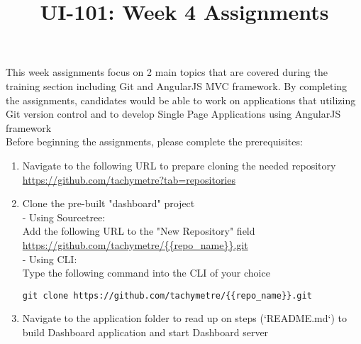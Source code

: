 \documentclass[12pt]{article}
\begin{document}
\title{UI-101: Week 4 Assignments}
\date{}
\author{}
\maketitle

\begin{flushleft}
This week assignments focus on 2 main topics that are covered during the training section including Git and AngularJS MVC framework. By completing the assignments, candidates would be able to work on applications that utilizing Git version control and to develop Single Page Applications using AngularJS framework \\
\vspace{5mm}
Before beginning the assignments, please complete the prerequisites:
\vspace{5mm}\\
\begin{enumerate}
	\item Navigate to the following URL to prepare cloning the needed repository
 	\url{https://github.com/tachymetre?tab=repositories}
 	\item Clone the pre-built "dashboard" project\\
 	-	Using Sourcetree: \\
 	\vspace{2mm}
Add the following URL to the "New Repository" field \url{https://github.com/tachymetre/{{repo_name}}.git}\\
	\vspace{5mm}
 	-	Using CLI: \\
Type the following command into the CLI of your choice
\begin{verbatim}
git clone https://github.com/tachymetre/{{repo_name}}.git
\end{verbatim}
\item Navigate to the application folder to read up on steps (`README.md`) to build Dashboard application and start Dashboard server\\
\end{enumerate}
\end{flushleft}
\end{document}
